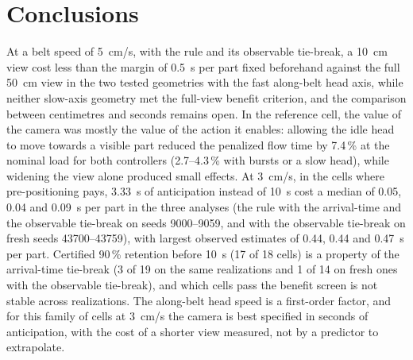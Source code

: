 \documentclass[11pt,a4paper]{article}
\begin{document}
\section{Conclusions}
At a belt speed of 5~cm/s, with the rule and its observable tie-break, a 10~cm view cost
less than the margin of 0.5~s per part fixed beforehand against the full 50~cm view in the
two tested geometries with the fast along-belt head axis, while neither slow-axis geometry
met the full-view benefit criterion, and the comparison between centimetres and seconds
remains open. In the reference cell, the value of the camera was mostly the value of the
action it enables: allowing the idle head to move towards a visible part reduced the
penalized flow time by 7.4\,\% at the nominal load for both controllers (2.7--4.3\,\% with
bursts or a slow head), while widening the view alone produced small effects. At 3~cm/s, in
the cells where pre-positioning pays, 3.33~s of anticipation instead of 10~s cost a median
of 0.05, 0.04 and 0.09~s per part in the three analyses (the rule with the arrival-time and
the observable tie-break on seeds 9000--9059, and with the observable tie-break on fresh
seeds 43700--43759), with largest observed estimates of
0.44, 0.44 and 0.47~s per part. Certified 90\,\% retention before 10~s (17 of 18 cells) is
a property of the arrival-time tie-break (3 of 19 on the same realizations and 1 of 14 on
fresh ones with the observable tie-break), and
which cells pass the benefit screen is not stable across realizations. The along-belt head
speed is a first-order factor, and for this family of cells at 3~cm/s the camera is best
specified in seconds of anticipation, with the cost of a shorter view measured, not by a
predictor to extrapolate.



\end{document}

